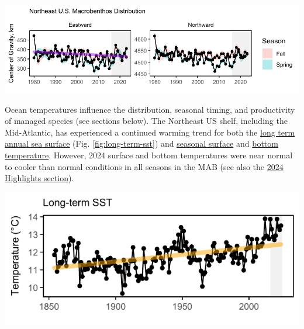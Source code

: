 \documentclass[
  10pt,
]{article}
\let\origfigure\figure
\let\endorigfigure\endfigure
\renewenvironment{figure}[1][2] {
    \expandafter\origfigure\expandafter[H]
} {
    \endorigfigure
}
\begin{document}
\begin{figure}

{\centering \includegraphics{midatlantic_files/figure-latex/macrobenthosshifts-1} 

}

\caption{Eastward (left) and northward (right) shifts in the center of gravity for macrobenthos species on the Northeast U.S. Shelf}\label{fig:macrobenthosshifts}
\end{figure}

Ocean temperatures influence the distribution, seasonal timing, and productivity of managed species (see sections below). The Northeast US shelf, including the Mid-Atlantic, has experienced a continued warming trend for both the \href{https://noaa-edab.github.io/catalog/long_term_sst.html}{long term annual sea surface} (Fig. \ref{fig:long-term-sst}) and \href{https://noaa-edab.github.io/catalog/seasonal_oisst_anom.html}{seasonal surface} and \href{https://noaa-edab.github.io/catalog/bottom_temp_model_anom.html}{bottom temperature}. However, 2024 surface and bottom temperatures were near normal to cooler than normal conditions in all seasons in the MAB (see also the \hyperref[highlights]{2024 Highlights section}).

\begin{figure}

{\centering \includegraphics{midatlantic_files/figure-latex/long-term-sst-1} 

}

\caption{Northeast US annual sea surface temperature (SST, black), with increasing trend (orange).}\label{fig:long-term-sst}
\end{figure}
\end{document}
